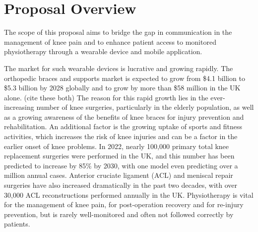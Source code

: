 \documentclass[main.tex]{subfiles}
\begin{document}
\section{Proposal Overview}

The scope of this proposal aims to bridge the gap in communication in the management of knee pain and to enhance patient access to monitored physiotherapy through a wearable device and mobile application.


The market for such wearable devices is lucrative and growing rapidly.
The orthopedic braces and supports market is expected to grow from \$4.1 billion to \$5.3 billion by 2028 globally and to grow by more than \$58 million in the UK alone. (cite these both)
The reason for this rapid growth lies in the ever-increasing number of knee surgeries, particularly in the elderly population, as well as a growing awareness of the benefits of knee braces for injury prevention and rehabilitation.
An additional factor is the growing uptake of sports and fitness activities, which increases the risk of knee injuries and can be a factor in the earlier onset of knee problems.
In 2022, nearly 100,000 primary total knee replacement surgeries were performed in the UK, and this number has been predicted to increase by 85\% by 2030, with one model even predicting over a million annual cases.
Anterior cruciate ligament (ACL) and meniscal repair surgeries have also increased dramatically in the past two decades, with over 30,000 ACL reconstructions performed annually in the UK.
Physiotherapy is vital for the management of knee pain, for post-operation recovery and for re-injury prevention, but is rarely well-monitored and often not followed correctly by patients.

\end{document}
